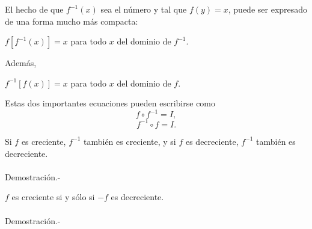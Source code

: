 El hecho de que $f^{-1}(x)$ sea el número y tal que $f(y)=x$, puede ser expresado de una forma mucho más compacta:
\begin{center}
    $f\left[f^{-1}(x)\right]=x$ para todo $x$ del dominio de $f^{-1}$.
\end{center}

Además,
\begin{center}
    $f^{-1}\left[f(x)\right]=x$ para todo $x$ del dominio de $f$.
\end{center}

Estas dos importantes ecuaciones pueden escribirse como
$$f\circ f^{-1}=I,$$
$$f^{-1}\circ f=I.$$

\begin{lema}
    Si $f$ es creciente, $f^{-1}$ también es creciente, y si $f$ es decreciente, $f^{-1}$ también es decreciente.\\\\
	Demostración.-\; 
\end{lema}

\begin{lema}
    $f$ es creciente si y sólo si $-f$ es decreciente.\\\\
	Demostración.-\; 
\end{lema}

